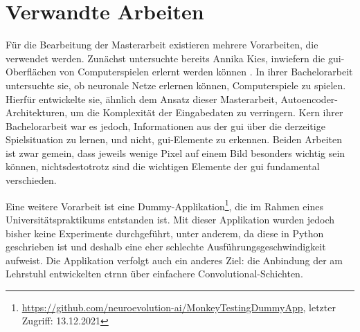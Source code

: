 \chapter{Verwandte Arbeiten}
Für die Bearbeitung der Masterarbeit existieren mehrere Vorarbeiten, die verwendet werden. Zunächst untersuchte bereits Annika Kies, inwiefern die \gls{gui}-Oberflächen von Computerspielen erlernt werden können \cite{kiesEntwicklungUndAnalyse2020}. In ihrer Bachelorarbeit untersuchte sie, ob neuronale Netze erlernen können, Computerspiele zu spielen. Hierfür entwickelte sie, ähnlich dem Ansatz dieser Masterarbeit, Autoencoder-Architekturen, um die Komplexität der Eingabedaten zu verringern. Kern ihrer Bachelorarbeit war es jedoch, Informationen aus der \gls{gui} über die derzeitige Spielsituation zu lernen, und nicht, \gls{gui}-Elemente zu erkennen. Beiden Arbeiten ist zwar gemein, dass jeweils wenige Pixel auf einem Bild besonders wichtig sein können, nichtsdestotrotz sind die wichtigen Elemente der \gls{gui} fundamental verschieden.


Eine weitere Vorarbeit ist eine Dummy-Applikation\footnote{\url{https://github.com/neuroevolution-ai/MonkeyTestingDummyApp}, letzter Zugriff: 13.12.2021}, die im Rahmen eines Universitätspraktikums entstanden ist. Mit dieser Applikation wurden jedoch bisher keine Experimente durchgeführt, unter anderem, da diese in Python geschrieben ist und deshalb eine eher schlechte Ausführungsgeschwindigkeit aufweist. Die Applikation verfolgt auch ein anderes Ziel: die Anbindung der am Lehrstuhl entwickelten \gls{ctrnn} über einfachere Convolutional-Schichten.

